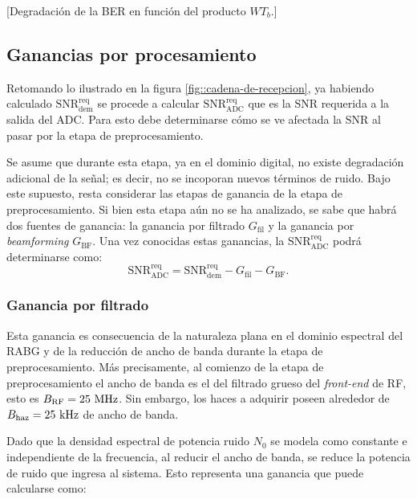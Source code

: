 \documentclass[../../main.tex]{subfiles}
\begin{document}
[Degradación de la BER en función del producto $W T_b$.]

\subsection{Ganancias por procesamiento} \label{sec::ganancias-por-preproc}
Retomando lo ilustrado en la figura \ref{fig::cadena-de-recepcion}, ya habiendo calculado $\textrm{SNR}^\textrm{req}_\textrm{dem}$ se procede a calcular $\textrm{SNR}^\textrm{req}_\textrm{ADC}$ que es la SNR requerida a la salida del ADC. Para esto debe determinarse cómo se ve afectada la SNR al pasar por la etapa de preprocesamiento.

Se asume que durante esta etapa, ya en el dominio digital, no existe degradación adicional de la señal; es decir, no se incoporan nuevos términos de ruido. 
Bajo este supuesto, resta considerar las etapas de ganancia de la etapa de preprocesamiento. 
Si bien esta etapa aún no se ha analizado, se sabe que habrá dos fuentes de ganancia: la ganancia por filtrado $G_\textrm{fil}$ y la ganancia por \textit{beamforming} $G_\textrm{BF}$. Una vez conocidas estas ganancias, la $\textrm{SNR}^\textrm{req}_\textrm{ADC}$ podrá determinarse como:
\begin{equation}
    \textrm{SNR}^\textrm{req}_\textrm{ADC} = \textrm{SNR}^\textrm{req}_\textrm{dem} - G_\textrm{fil} - G_\textrm{BF}.
    \label{eq::SRN2SNR}
\end{equation}

\subsubsection{Ganancia por filtrado}
Esta ganancia es consecuencia de la naturaleza plana en el dominio espectral del RABG y de la reducción de ancho de banda durante la etapa de preprocesamiento. Más precisamente, al comienzo de la etapa de preprocesamiento el ancho de banda es el del filtrado grueso del \textit{front-end} de RF, esto es $B_\textrm{RF} = 25~\textrm{MHz}$. Sin embargo, los haces a adquirir poseen alrededor de $B_\textrm{haz} = 25~\textrm{kHz}$ de ancho de banda. 

Dado que la densidad espectral de potencia ruido $N_0$ se modela como constante e independiente de la frecuencia, al reducir el ancho de banda, se reduce la potencia de ruido que ingresa al sistema. Esto representa una ganancia que puede calcularse como:
\end{document}
